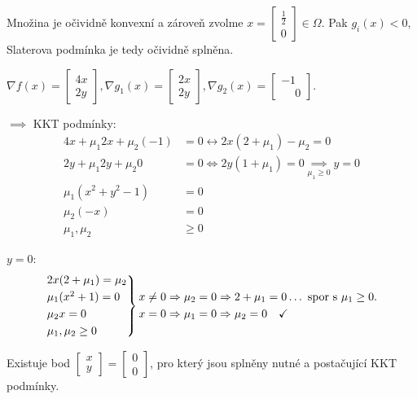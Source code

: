 Množina je očividně konvexní a zároveň zvolme $x = 
\begin{bmatrix}
    \frac{1}{2} \\
    0    
\end{bmatrix} \in \Omega$. Pak $g_i (x) < 0$, Slaterova podmínka je tedy očividně splněna.

$\nabla f (x) = 
\begin{bmatrix}
    4x \\
    2y    
\end{bmatrix}, \nabla g_1(x) =
\begin{bmatrix}
    2x \\
    2y
\end{bmatrix}, \nabla g_2(x) = 
\begin{bmatrix}
    -1\\
    \phantom{-}0
\end{bmatrix}$.

$\implies$ KKT podmínky:
\begin{align*}
    4x + \mu_1 2 x + \mu_2 (-1) &= 0 \leftrightarrow 2x (2+\mu_1) - \mu_2 = 0 \\
    2y + \mu_1 2 y + \mu_2 0    &= 0 \Leftrightarrow 2y (1+\mu_1) = 0 \underset{\mu_1 \geq 0}{\implies} y = 0 \\
    \mu_1(x^2 + y^2 - 1) &= 0 \\
    \mu_2(-x) &= 0 \\
    \mu_1, \mu_2 &\geq 0  
\end{align*}

$y=0$:
\[
    \begin{rcases*}
        2x(2+ \mu_1) = \mu_2 \\
        \mu_1(x^2 + 1) = 0 \\
        \mu_2 x = 0 \\
        \mu_1, \mu_2 \geq 0
    \end{rcases*}
    \begin{aligned}
        &x \not= 0 \Rightarrow \mu_2 = 0 \Rightarrow 2 + \mu_1 = 0 \dots \text{ spor s } \mu_1 \geq 0.\\
        &x = 0 \Rightarrow \mu_1 = 0 \Rightarrow \mu_2 = 0 \quad \checkmark
    \end{aligned}
\]

Existuje bod $
\begin{bmatrix}
x \\
y    
\end{bmatrix} =
\begin{bmatrix}
    0 \\
    0
\end{bmatrix}$, pro který jsou splněny nutné a postačující KKT podmínky.


